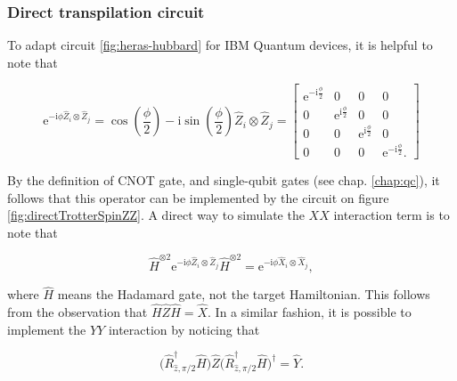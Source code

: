     \subsubsection{Direct transpilation circuit}
    \label{subsubsec:DirectTranspilationCircuit}

      To adapt circuit \ref{fig:heras-hubbard} for IBM Quantum devices, it is helpful to note that

      \begin{equation}
        \mathrm{e}^{-\mathrm{i}\phi \hat{Z}_i \otimes \hat{Z}_j} = \cos(\frac{\phi}{2}) - \mathrm{i}\sin(\frac{\phi}{2}) \hat{Z}_i \otimes \hat{Z}_j = 
        \begin{bmatrix}
          \mathrm{e}^{-\mathrm{i}\frac{\phi}{2}} & 0 & 0 & 0 \\
          0 & \mathrm{e}^{\mathrm{i}\frac{\phi}{2}} & 0 & 0 \\
          0 & 0 & \mathrm{e}^{\mathrm{i}\frac{\phi}{2}} & 0 \\
          0 & 0 & 0 & \mathrm{e}^{-\mathrm{i}\frac{\phi}{2}}.
        \end{bmatrix}
        \label{eq:expZZ}
      \end{equation}

      By the definition of CNOT gate, and single-qubit gates (see chap. \ref{chap:qc}), it follows that this operator can be implemented by the circuit on figure \ref{fig:directTrotterSpinZZ}. A direct way to simulate the $XX$ interaction term is to note that

      \begin{equation}
        \hat{H}^{\otimes 2} \mathrm{e}^{-\mathrm{i}\phi \hat{Z}_i \otimes \hat{Z}_j} \hat{H}^{\otimes 2} = \mathrm{e}^{-\mathrm{i}\phi \hat{X}_i \otimes \hat{X}_j},
        \label{eq:Z2X}
      \end{equation}

      \noindent where $\hat{H}$ means the Hadamard gate, not the target Hamiltonian. This follows from the observation that $\hat{H}\hat{Z}\hat{H} = \hat{X}$. In a similar fashion, it is possible to implement the $YY$ interaction by noticing that

      \begin{equation}
        \Big(\hat{R}_{\hat{z}, \pi/2}^{\dagger}\hat{H}\Big)\hat{Z}\Big(\hat{R}_{\hat{z}, \pi/2}^{\dagger}\hat{H}\Big)^{\dagger} = \hat{Y}.
        \label{eq:Z2Y}
      \end{equation}

      

